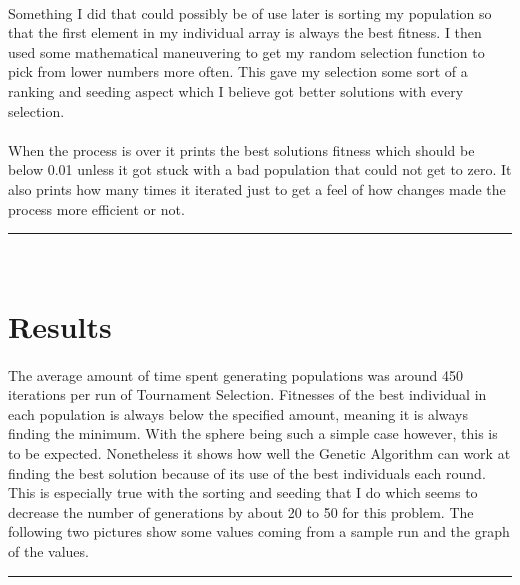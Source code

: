 \documentclass[paper=a4, fontsize=11pt]{scrartcl} %
\numberwithin{equation}{section} %
\numberwithin{figure}{section} %
\numberwithin{table}{section} %
\newcommand{\horrule}[1]{\rule{\linewidth}{#1}} %
\begin{document}
\paragraph{} Something I did that could possibly be of use later is sorting my population so that the first element in my individual array is always the best fitness. I then used some mathematical maneuvering to get my random selection function to pick from lower numbers more often. This gave my selection some sort of a ranking and seeding aspect which I believe got better solutions with every selection.

\paragraph{}When the process is over it prints the best solutions fitness which should be below 0.01 unless it got stuck with a bad population that could not get to zero. It also prints how many times it iterated just to get a feel of how changes made the process more efficient or not.

\horrule{0.5pt} \\[0.4cm] %
\section{Results}

\paragraph{} The average amount of time spent generating populations was around 450 iterations per run of Tournament Selection. Fitnesses of the best individual in each population is always below the specified amount, meaning it is always finding the minimum. With the sphere being such a simple case however, this is to be expected. Nonetheless it shows how well the Genetic Algorithm can work at finding the best solution because of its use of the best individuals each round. This is especially true with the sorting and seeding that I do which seems to decrease the number of generations by about 20 to 50 for this problem. The following two pictures show some values coming from a sample run and the graph of the values.
\newline

\horrule{0.5pt} \\[0.4cm] %
\end{document}
